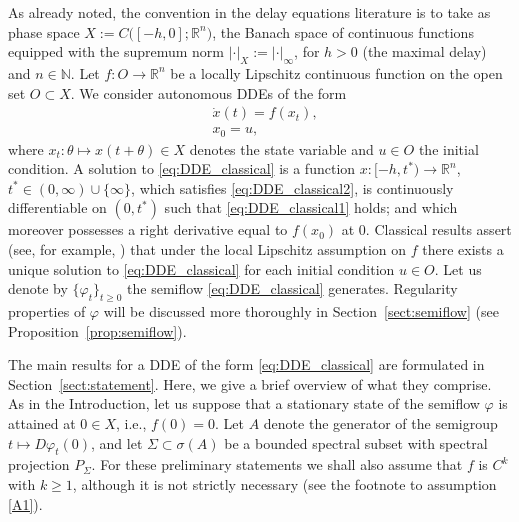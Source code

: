 \documentclass[a4paper, 12pt, oneside, reqno, notitlepage]{amsart}
\theoremstyle{plain}
\theoremstyle{definition}
\theoremstyle{remark}
\begin{document}
As already noted, the convention in the delay equations literature is to take 
as phase space $X := C\big([-h,0];\mathbb{R}^n \big)$, the Banach space of continuous functions equipped with the supremum norm $| \cdot|_X :=| \cdot |_{\infty}$, for $h>0$ (the maximal delay) and $n \in \mathbb{N}$.
Let $f : O \to \mathbb{R}^n$ be a locally Lipschitz continuous function on the open set $O \subset X$.
We consider autonomous DDEs of the form
\begin{subequations} \label{eq:DDE_classical} 
\begin{align}
&\dot{x}(t) = f(x_t),  \label{eq:DDE_classical1} \\ 
& x_0 = u,  \label{eq:DDE_classical2}
\end{align}
\end{subequations}
where 
$x_t : \theta \mapsto x(t+\theta) \in X$ denotes the state variable and $u \in O$ the initial condition.
A solution to \eqref{eq:DDE_classical} is a function $x: [-h,t^*) \to \mathbb{R}^n$, $t^* \in (0,\infty) \cup \{\infty\}$, 
which satisfies \eqref{eq:DDE_classical2},
is continuously differentiable on $(0,t^*)$ such that \eqref{eq:DDE_classical1} holds; and which moreover possesses a right derivative equal to $f(x_0)$ at $0$.
Classical results assert (see, for example, \cite{hale2013introduction,diekmann2012delay}) that under the local Lipschitz assumption on $f$ there exists a unique solution to \eqref{eq:DDE_classical} for each initial condition $u \in O$.
Let us denote by $\{\varphi_t\}_{t \geq 0}$ the semiflow \eqref{eq:DDE_classical} generates.
Regularity properties of $\varphi$ will be discussed more thoroughly in Section~\ref{sect:semiflow} (see Proposition~\ref{prop:semiflow}).







The main results for a DDE of the form \eqref{eq:DDE_classical} are formulated in Section~\ref{sect:statement}.
Here, we give a brief overview of what they comprise. 
As in the Introduction, let us suppose that a stationary state of the semiflow $\varphi$ is attained at $0 \in X$, i.e., $f(0) = 0$.
Let $A$ denote the generator of the semigroup $t \mapsto D \varphi_t(0)$, and let $\Sigma \subset \sigma(A)$ be a bounded spectral subset with spectral projection $P_\Sigma$. 
For these preliminary statements we shall also assume that $f$ is $C^k$ with $k \geq 1$, although it is not strictly necessary (see the footnote to assumption \ref{A1}).
\end{document}
